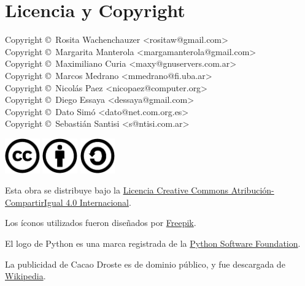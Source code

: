 
\chapter*{Licencia y Copyright}

{\noindent
Copyright \copyright\ Rosita Wachenchauzer <rositaw@gmail.com> \\
Copyright \copyright\ Margarita Manterola <margamanterola@gmail.com> \\
Copyright \copyright\ Maximiliano Curia <maxy@gnuservers.com.ar> \\
Copyright \copyright\ Marcos Medrano <mmedrano@fi.uba.ar> \\
Copyright \copyright\ Nicolás Paez <nicopaez@computer.org> \\
Copyright \copyright\ Diego Essaya <dessaya@gmail.com> \\
Copyright \copyright\ Dato Simó <dato@net.com.org.es> \\
Copyright \copyright\ Sebastián Santisi <s@ntisi.com.ar> \\
}

\begin{center}
\noindent
\includegraphics[height=1.5cm]{graficos/cc/cc}
\hspace{0.5cm}
\includegraphics[height=1.5cm]{graficos/cc/by}
\hspace{0.5cm}
\includegraphics[height=1.5cm]{graficos/cc/sa}
\end{center}

Esta obra se distribuye bajo la
\href{http://creativecommons.org/licenses/by-sa/4.0/deed.es}{Licencia Creative
Commons Atribución-CompartirIgual 4.0 Internacional}.

Los íconos utilizados fueron diseñados por
\href{http://www.freepik.com/}{Freepik}.

El logo de Python es una marca registrada de la
\href{https://www.python.org/psf/}{Python Software Foundation}.

La publicidad de Cacao Droste es de dominio público, y fue descargada de
\href{http://en.wikipedia.org/wiki/Image:Droste.jpg}{Wikipedia}.
